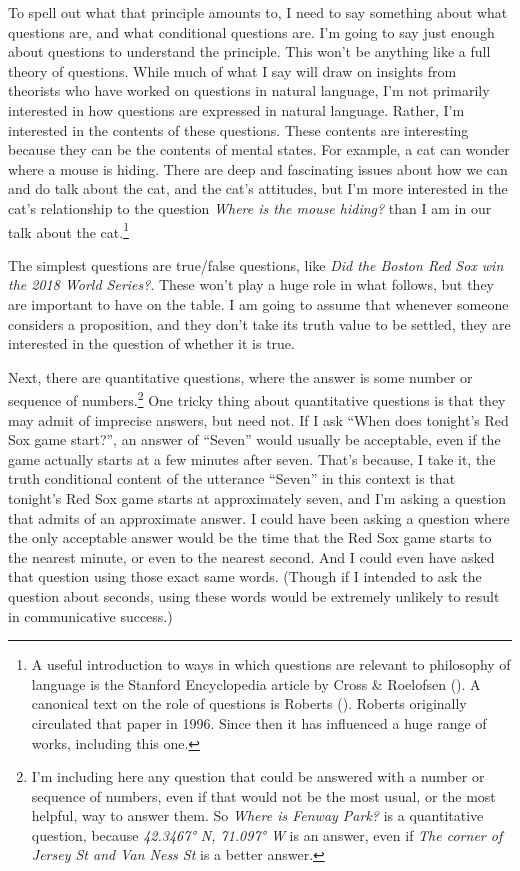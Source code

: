 \documentclass[
  10pt,
  letterpaper,
  twoside]{scrbook}
\begin{document}
To spell out what that principle amounts to, I need to say something
about what questions are, and what conditional questions are. I'm going
to say just enough about questions to understand the principle. This
won't be anything like a full theory of questions. While much of what I
say will draw on insights from theorists who have worked on questions in
natural language, I'm not primarily interested in how questions are
expressed in natural language. Rather, I'm interested in the contents of
these questions. These contents are interesting because they can be the
contents of mental states. For example, a cat can wonder where a mouse
is hiding. There are deep and fascinating issues about how we can and do
talk about the cat, and the cat's attitudes, but I'm more interested in
the cat's relationship to the question \emph{Where is the mouse hiding?}
than I am in our talk about the cat.\footnote{A useful introduction to
  ways in which questions are relevant to philosophy of language is the
  Stanford Encyclopedia article by Cross \& Roelofsen
  (). A canonical text on the role of
  questions is Roberts (). Roberts
  originally circulated that paper in 1996. Since then it has influenced
  a huge range of works, including this one.}

The simplest questions are true/false questions, like \emph{Did the
Boston Red Sox win the 2018 World Series?}. These won't play a huge role
in what follows, but they are important to have on the table. I am going
to assume that whenever someone considers a proposition, and they don't
take its truth value to be settled, they are interested in the question
of whether it is true.

Next, there are quantitative questions, where the answer is some number
or sequence of numbers.\footnote{I'm including here any question that
  could be answered with a number or sequence of numbers, even if that
  would not be the most usual, or the most helpful, way to answer them.
  So \emph{Where is Fenway Park?} is a quantitative question, because
  \emph{42.3467° N, 71.097° W} is an answer, even if \emph{The corner of
  Jersey St and Van Ness St} is a better answer.} One tricky thing about
quantitative questions is that they may admit of imprecise answers, but
need not. If I ask ``When does tonight's Red Sox game start?'', an
answer of ``Seven'' would usually be acceptable, even if the game
actually starts at a few minutes after seven. That's because, I take it,
the truth conditional content of the utterance ``Seven'' in this context
is that tonight's Red Sox game starts at approximately seven, and I'm
asking a question that admits of an approximate answer. I could have
been asking a question where the only acceptable answer would be the
time that the Red Sox game starts to the nearest minute, or even to the
nearest second. And I could even have asked that question using those
exact same words. (Though if I intended to ask the question about
seconds, using these words would be extremely unlikely to result in
communicative success.)
\end{document}

